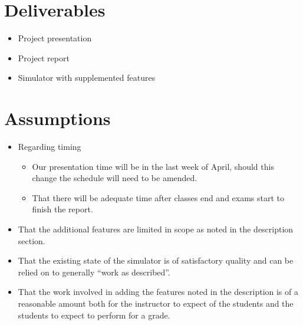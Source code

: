 \documentclass{article}
\begin{document}
\section{Deliverables}

\begin{itemize}
\item Project presentation
\item Project report
\item Simulator with supplemented features
\end{itemize}

\section{Assumptions}

\begin{itemize}
\item Regarding timing
  \begin{itemize}
  \item Our presentation time will be in the last week of April,
    should this change the schedule will need to be amended.
  \item That there will be adequate time after classes end and exams
    start to finish the report.
  \end{itemize}
\item That the additional features are limited in scope as noted in
  the description section.

\item That the existing state of the simulator is of satisfactory
  quality and can be relied on to generally “work as described”.

\item That the work involved in adding the features noted in the
  description is of a reasonable amount both for the instructor to
  expect of the students and the students to expect to perform for a
  grade.
\end{itemize}

\newpage


\end{document}
